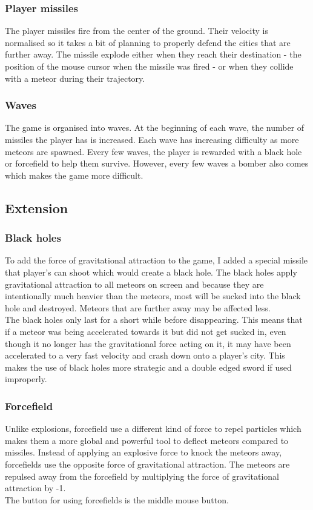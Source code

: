 \documentclass{article}
\newcommand{\n}[0]{\\[\baselineskip]}
\begin{document}
\subsubsection*{Player missiles}
The player missiles fire from the center of the ground. Their velocity is normalised so it takes a bit of planning to properly defend the cities that are further away. The missile explode either when they reach their destination - the position of the mouse cursor when the missile was fired - or when they collide with a meteor during their trajectory. 


\subsubsection*{Waves}
The game is organised into waves. At the beginning of each wave, the number of missiles the player has is increased. Each wave has increasing difficulty as more meteors are spawned. Every few waves, the player is rewarded with a black hole or forcefield to help them survive. However, every few waves a bomber also comes which makes the game more difficult.


\subsection{Extension}

\subsubsection*{Black holes}
To add the force of gravitational attraction to the game, I added a special missile that player's can shoot which would create a black hole. The black holes apply gravitational attraction to all meteors on screen and because they are intentionally much heavier than the meteors, most will be sucked into the black hole and destroyed. Meteors that are further away may be affected less.
\n
The black holes only last for a short while before disappearing. This means that if a meteor was being accelerated towards it but did not get sucked in, even though it no longer has the gravitational force acting on it, it may have been accelerated to a very fast velocity and crash down onto a player's city. This makes the use of black holes more strategic and a double edged sword if used improperly. 
\subsubsection*{Forcefield}
Unlike explosions, forcefield use a different kind of force to repel particles which makes them a more global and powerful tool to deflect meteors compared to missiles. Instead of applying an explosive force to knock the meteors away, forcefields use the opposite force of gravitational attraction. The meteors are repulsed away from the forcefield by multiplying the force of gravitational attraction by -1. 
\n
The button for using forcefields is the middle mouse button.
\end{document}
